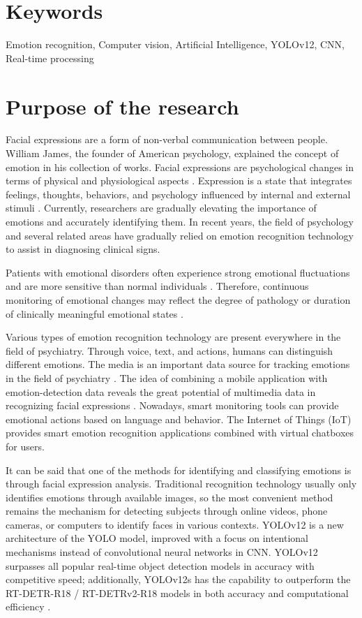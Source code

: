 \documentclass[a4paper,13pt]{report}
\begin{document}
\section{Keywords}
Emotion recognition, Computer vision, Artificial Intelligence, YOLOv12, CNN, Real-time processing %

\section{Purpose of the research}
Facial expressions are a form of non-verbal communication between people. William James, the founder of American psychology, explained the concept of emotion in his collection of works. Facial expressions are psychological changes in terms of physical and physiological aspects \cite{james1948}. Expression is a state that integrates feelings, thoughts, behaviors, and psychology influenced by internal and external stimuli \cite{lange2009}. Currently, researchers are gradually elevating the importance of emotions and accurately identifying them. In recent years, the field of psychology and several related areas have gradually relied on emotion recognition technology to assist in diagnosing clinical signs. 


 Patients with emotional disorders often experience strong emotional fluctuations and are more sensitive than normal individuals \cite{bonsall2012}. Therefore, continuous monitoring of emotional changes may reflect the degree of pathology or duration of clinically meaningful emotional states \cite{guo2024}. 


Various types of emotion recognition technology are present everywhere in the field of psychiatry. Through voice, text, and actions, humans can distinguish different emotions. The media is an important data source for tracking emotions in the field of psychiatry \cite{hale2021, pellert2020}. The idea of combining a mobile application with emotion-detection data reveals the great potential of multimedia data in recognizing facial expressions \cite{oliver2020}. Nowadays, smart monitoring tools can provide emotional actions based on language and behavior. The Internet of Things (IoT) provides smart emotion recognition applications combined with virtual chatboxes for users.


It can be said that one of the methods for identifying and classifying emotions is through facial expression analysis. Traditional recognition technology usually only identifies emotions through available images, so the most convenient method remains the mechanism for detecting subjects through online videos, phone cameras, or computers to identify faces in various contexts. YOLOv12 is a new architecture of the YOLO model, improved with a focus on intentional mechanisms instead of convolutional neural networks in CNN. YOLOv12 surpasses all popular real-time object detection models in accuracy with competitive speed; additionally, YOLOv12s has the capability to outperform the RT-DETR-R18 / RT-DETRv2-R18 models in both accuracy and computational efficiency \cite{tian2025}. 
\end{document}
